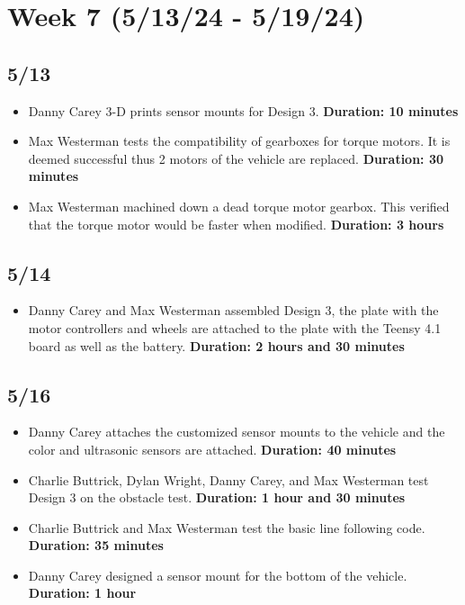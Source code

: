 \documentclass[12pt]{report}
\begin{document}
\section{Week 7 (5/13/24 - 5/19/24)}
\subsection*{5/13}

\begin{itemize}
    \item Danny Carey 3-D prints sensor mounts for Design 3. \textbf{Duration: 10 minutes}
    \item Max Westerman tests the compatibility of gearboxes for torque motors. It is deemed successful thus 2 motors of the vehicle are replaced. \textbf{Duration: 30 minutes}
    \item Max Westerman machined down a dead torque motor gearbox. This verified that the torque motor would be faster when modified. \textbf{Duration: 3 hours}
\end{itemize}

\subsection*{5/14}

\begin{itemize}
    \item Danny Carey and Max Westerman assembled Design 3, the plate with the motor controllers and wheels are attached to the plate with the Teensy 4.1 board as well as the battery. \textbf{Duration: 2 hours and 30 minutes}
\end{itemize}

\subsection*{5/16}

\begin{itemize}
    \item Danny Carey attaches the customized sensor mounts to the vehicle and the color and ultrasonic sensors are attached. \textbf{Duration: 40 minutes}
    \item Charlie Buttrick, Dylan Wright, Danny Carey, and Max Westerman test Design 3 on the obstacle test. \textbf{Duration: 1 hour and 30 minutes}
    \item Charlie Buttrick and Max Westerman test the basic line following code. \textbf{Duration: 35 minutes}
    \item Danny Carey designed a sensor mount for the bottom of the vehicle. \textbf{Duration: 1 hour}
\end{itemize}
\end{document}
